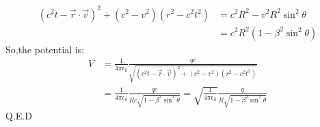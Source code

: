 \documentclass[UTF8]{ctexart}
\begin{document}
	$$\begin{aligned}
		\left(c^{2} t-\vec{r} \cdot \vec{v}\right)^{2}+\left(c^{2}-v^{2}\right)\left(r^{2}-c^{2} t^{2}\right) &=c^{2} R^{2}-v^{2} R^{2} \sin ^{2} \theta \\
		&=c^{2} R^{2}\left(1-\beta^{2} \sin ^{2} \theta\right)
	\end{aligned}$$
	So,the potential is:
	$$\begin{aligned}
	V &=\frac{1}{4 \pi \epsilon_{0}} \frac{q c}{\sqrt{\left(c^{2} t-\vec{r} \cdot \vec{v}\right)^{2}+\left(c^{2}-v^{2}\right)\left(r^{2}-c^{2} t^{2}\right)}} \\
	&=\frac{1}{4 \pi \epsilon_{0}} \frac{q c}{R c \sqrt{1-\beta^{2} \sin ^{2} \theta}}=\sqrt{\frac{1}{4 \pi \epsilon_{0}}} \frac{q}{R \sqrt{1-\beta^{2} \sin ^{2} \theta}}
	\end{aligned}$$
	Q.E.D\\
	
\end{document}
